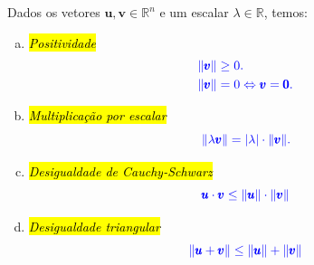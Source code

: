 \begin{prop}
  Dados os vetores $\pmb{u},\pmb{v} \in \mathbb{R}^n$ e um escalar $\lambda\in\mathbb{R}$, temos:
  \begin{enumerate}[a)]
  \item \hl{\emph{Positividade}}
    \begin{align}
      &\color{blue}\|\pmb{v}\| \geq 0.\\
      &\color{blue}\|\pmb{v}\| = 0 \Leftrightarrow \pmb{v} = \pmb{0}.
    \end{align}
    
  \item \hl{\emph{Multiplicação por escalar}}
    \begin{equation}\color{blue}\|\lambda \pmb{v}\| = |\lambda|\cdot \|\pmb{v}\|.
    \end{equation}
    
  \item \hl{\emph{Desigualdade de Cauchy}}{\cauchy}\hl{\emph{-Schwarz}}{\schwarz}
    \begin{equation}\label{cap_sislin_sec_ncond:eq:cauchy-schwarz}
      \color{blue}\pmb{u}\cdot \pmb{v} \leq \|\pmb{u}\|\cdot\|\pmb{v}\|
    \end{equation}

  \item \hl{\emph{Desigualdade triangular}}
    \begin{equation}\label{cap_sislin_sec_ncond:eq:destria}
      \color{blue}\|\pmb{u}+\pmb{v}\| \leq \|\pmb{u}\| + \|\pmb{v}\|
    \end{equation}
  \end{enumerate}
\end{prop}
